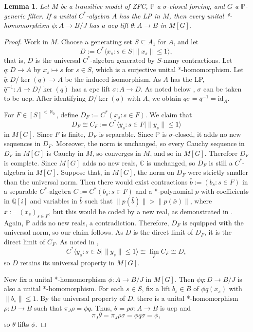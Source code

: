 \documentclass[10pt]{amsart}
\newtheorem{lem}[thm]{Lemma}
\theoremstyle{definition}
\begin{document}
\begin{lem}\label{forc}
    Let $M$ be a transitive model of ZFC, $\mathbb{P}$ a $\sigma$-closed forcing, and $G$ a $\mathbb{P}$-generic filter. If a unital $C^*$-algebra $A$ has the LP in $M$, then every unital *-homomorphism $\phi: A\rightarrow B/J$ has a ucp lift $\theta: A \rightarrow B$ in $M[G]$.
\end{lem}

\begin{proof}
    Work in $M$. Choose a generating set $S\subseteq A_1$ for $A$, and let
    \[D:=C^*\langle x_s:s\in S\mid \|x_s\|\leq 1\rangle,\]
    that is, $D$ is the universal $C^*$-algebra generated by $S$-many contractions. Let $q: D\rightarrow A$ by $x_s\mapsto s$ for $s\in S$, which is a surjective unital *-homomorphism. Let $\bar{q}:D/\ker(q)\rightarrow A$ be the induced isomorphism. As $A$ has the LP, $\bar{q}^{-1}:A\rightarrow D/\ker(q)$ has a cpc lift $\sigma: A\rightarrow D$. As noted below \cite[C.1]{BROZ}, $\sigma$ can be taken to be ucp. After identifying $D/\ker(q)$ with $A$, we obtain $q\sigma=\bar{q}^{-1}=\mathrm{id}_A$.

    For $F\in[S]^{<\aleph_0}$, define $D_F:=C^*(x_s:s\in F)$. We claim that 
    \[D_F\cong C_F:=C^*\langle y_s:s\in F\mid \|y_s\|\leq 1\rangle\]
    in $M[G]$. Since $F$ is finite, $D_F$ is separable. Since $\mathbb{P}$ is $\sigma$-closed, it adds no new sequences in $D_F$. Moreover, the norm is unchanged, so every Cauchy sequence in $D_F$ in $M[G]$ is Cauchy in $M$, so converges in $M$, and so in $M[G]$. Therefore $D_F$ is complete. Since $M[G]$ adds no new reals, $\mathbb{C}$ is unchanged, so $D_F$ is still a $C^*$-algebra in $M[G]$. Suppose that, in $M[G]$, the norm on $D_F$ were strictly smaller than the universal norm. Then there would exist contractions $\bar{b}:=(b_s:s\in F)$ in a separable $C^*$-algebra $C:=C^*(b_s:s\in F)$ and a *-polynomial $p$ with coefficients in $\mathbb{Q}[i]$ and variables in $\bar{b}$ such that $\|p(\bar{b})\|>\|p(\bar{x})\|$, where $\bar{x}:=(x_s)_{s\in F}$, but this would be coded by a new real, as demonstrated in \cite[\S 2.3]{FTT}. Again, $\mathbb{P}$ adds no new reals, a contradiction. Therefore, $D_F$ is equipped with the universal norm, so our claim follows. As $D$ is the direct limit of $D_F$, it is the direct limit of $C_F$. As noted in \cite[2.3.11]{FA19},
    \[C^*\langle y_s:s\in S\mid \|y_s\|\leq 1\rangle\cong \lim_F C_F \cong D,\]
    so $D$ retains its universal property in $M[G]$.

    Now fix a unital *-homomorphism $\phi : A\rightarrow B/J$ in $M[G]$. Then $\phi q:D\rightarrow B/J$ is also a unital *-homomorphism. For each $s\in S$, fix a lift $b_s\in B$ of $\phi q(x_s)$ with $\|b_s\|\leq 1$. By the universal property of $D$, there is a unital *-homomorphism $\rho: D\rightarrow B$ such that $\pi_J \rho=\phi q$. Thus, $\theta=\rho\sigma: A\rightarrow B$ is ucp and 
    \[\pi_J\theta=\pi_J\rho\sigma=\phi q\sigma=\phi,\]
    so $\theta$ lifts $\phi$.
\end{proof}
\end{document}
